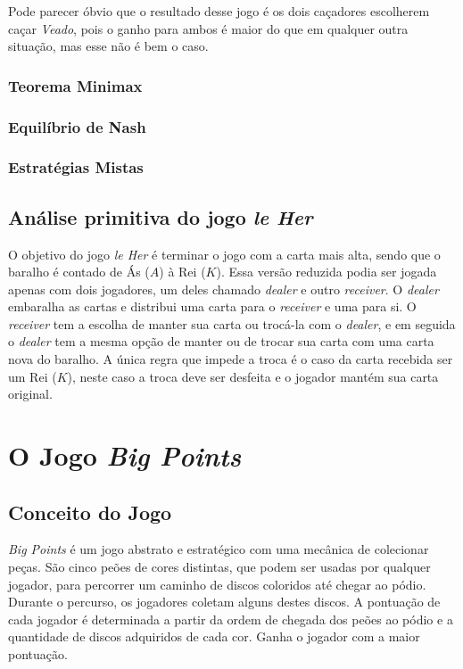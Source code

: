 Pode parecer óbvio que o resultado desse jogo é os dois caçadores escolherem caçar \emph{Veado}, pois o ganho para ambos é maior do que em qualquer outra situação, mas esse não é bem o caso.

\subsubsection{Teorema Minimax}
\label{subsubsec:teorema-minimax}

\subsubsection{Equilíbrio de Nash}
\label{subsubsec:equilibrio-de-nash}

\subsubsection{Estratégias Mistas}
\label{subsubsec:estrategias-mistas}


\subsection{Análise primitiva do jogo \emph{le Her}}
\label{subsec:analise-primitiva-do-jogo-le-her}

O objetivo do jogo \emph{le Her} é terminar o jogo com a carta mais alta, sendo que o baralho é contado de Ás ($A$) à Rei ($K$). Essa versão reduzida podia ser jogada apenas com dois jogadores, um deles chamado \emph{dealer} e outro \emph{receiver}. O \emph{dealer} embaralha as cartas e distribui uma carta para o \emph{receiver} e uma para si. O \emph{receiver} tem a escolha de manter sua carta ou trocá-la com o \emph{dealer}, e em seguida o \emph{dealer} tem a mesma opção de manter ou de trocar sua carta com uma carta nova do baralho. A única regra que impede a troca é o caso da carta recebida ser um Rei ($K$), neste caso a troca deve ser desfeita e o jogador mantém sua carta original.


\section{O Jogo \emph{Big Points}}
\subsection{Conceito do Jogo}
\label{subsec:conceito-do-jogo}
\emph{Big Points} é um jogo abstrato e estratégico com uma mecânica de colecionar peças. São cinco peões de cores distintas, que podem ser usadas por qualquer jogador, para percorrer um caminho de discos coloridos até chegar ao pódio. Durante o percurso, os jogadores coletam alguns destes discos. A pontuação de cada jogador é determinada a partir da ordem de chegada dos peões ao pódio e a quantidade de discos adquiridos de cada cor. Ganha o jogador com a maior pontuação.

